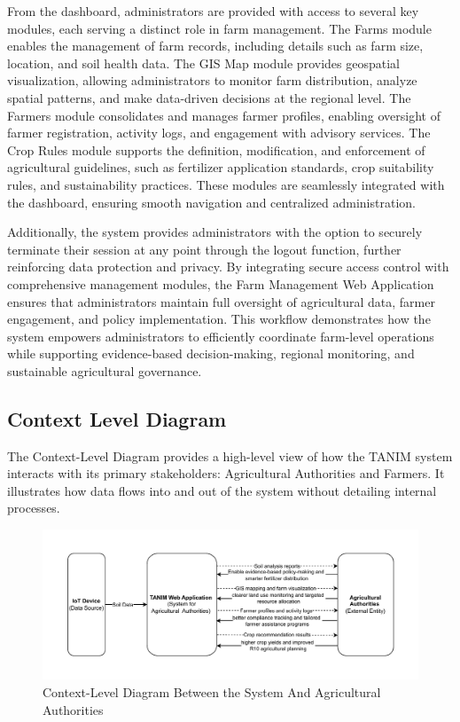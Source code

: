 {	From the dashboard, administrators are provided with access to several key modules, each serving a distinct role in farm management. The Farms module enables the management of farm records, including details such as farm size, location, and soil health data. The GIS Map module provides geospatial visualization, allowing administrators to monitor farm distribution, analyze spatial patterns, and make data-driven decisions at the regional level. The Farmers module consolidates and manages farmer profiles, enabling oversight of farmer registration, activity logs, and engagement with advisory services. The Crop Rules module supports the definition, modification, and enforcement of agricultural guidelines, such as fertilizer application standards, crop suitability rules, and sustainability practices. These modules are seamlessly integrated with the dashboard, ensuring smooth navigation and centralized administration. 
	
	Additionally, the system provides administrators with the option to securely terminate their session at any point through the logout function, further reinforcing data protection and privacy. By integrating secure access control with comprehensive management modules, the Farm Management Web Application ensures that administrators maintain full oversight of agricultural data, farmer engagement, and policy implementation. This workflow demonstrates how the system empowers administrators to efficiently coordinate farm-level operations while supporting evidence-based decision-making, regional monitoring, and sustainable agricultural governance.
	
	\subsection{Context Level Diagram}
	The Context-Level Diagram provides a high-level view of how the TANIM system interacts with its primary stakeholders: Agricultural Authorities and Farmers. It illustrates how data flows into and out of the system without detailing internal processes.
	
	\begin{figure}[H]
		\centering
		\caption{Context-Level Diagram Between the System And Agricultural Authorities}
		\label{fig:CLDSystem&AgriAuthorities}
		\includegraphics[width=1\textwidth]{figures/cldWEB.pdf}
	\end{figure}
	
}
